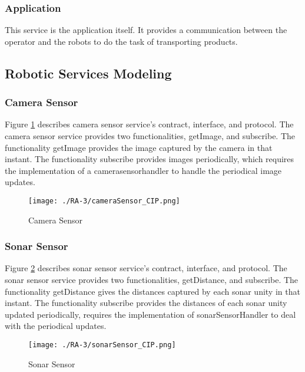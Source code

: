 \subsubsection*{Application}
This service is the application itself. It provides a communication between the operator and the robots to do the task of transporting products.

\subsection{Robotic Services Modeling}
\label{ssec:services_modeling}
\subsubsection{Camera Sensor} %
Figure \ref{fig:camerasensor_cip} describes camera sensor service's contract, interface, and protocol. The camera sensor service provides two functionalities, getImage, and subscribe. The functionality getImage provides the image captured by the camera in that instant. The functionality subscribe provides images periodically, which requires the implementation of a camerasensorhandler to handle the periodical image updates.
\begin{figure}[ht!]
 \centering
 \texttt{[image: ./RA-3/cameraSensor\_CIP.png]}
 \caption{Camera Sensor}
 \label{fig:camerasensor_cip}
\end{figure}

\subsubsection{Sonar Sensor} %
Figure \ref{fig:sonarsensor_cip} describes sonar sensor service's contract, interface, and protocol. The sonar sensor service provides two functionalities, getDistance, and subscribe. The functionality getDistance gives the distances captured by each sonar unity in that instant. The functionality subscribe provides the distances of each sonar unity updated periodically, requires the implementation of sonarSensorHandler to deal with the periodical updates.
\begin{figure}[ht!]
 \centering
 \texttt{[image: ./RA-3/sonarSensor\_CIP.png]}
 \caption{Sonar Sensor}
 \label{fig:sonarsensor_cip}
\end{figure}

